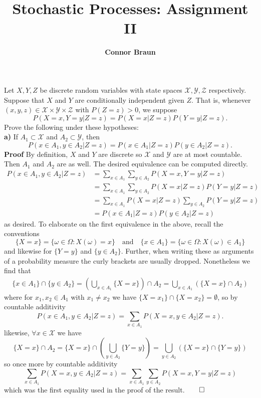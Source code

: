\documentclass[11pt, letterpaper]{article}
\title{\bf Stochastic Processes: Assignment II}
\author{\bf Connor Braun}
\date{}
\newcommand{\mc}[1]{\mathcal{#1}}
\begin{document}
    \maketitle
     Let $X,Y,Z$ be discrete random variables with state spaces $\mc{X},\mc{Y},\mc{Z}$ respectively. Suppose that $X$ and $Y$ are
    conditionally independent given $Z$. That is, whenever $(x,y,z)\in\mc{X}\times\mc{Y}\times\mc{Z}$ with $P(Z=z)>0$, we suppose
    \[P(X=x,Y=y|Z=z)=P(X=x|Z=z)P(Y=y|Z=z).\]
    Prove the following under these hypotheses:\\[10pt]
    {\bf a)} If $A_1\subset\mc{X}$ and $A_2\subset\mc{Y}$, then
    \[P(x\in A_1,y\in A_2|Z=z)=P(x\in A_1|Z=z)P(y\in A_2|Z=z).\]
    {\bf Proof} By definition, $X$ and $Y$ are discrete so $\mc{X}$ and $\mc{Y}$ are at most countable. Then $A_1$ and $A_2$ are as well. The desired equivalence can be computed directly.
    \begin{align*}
        P(x\in A_1,y\in A_2|Z=z)&=\sum_{x\in A_1}\sum_{y\in A_2}P(X=x,Y=y|Z=z)\tag{countable additivity}\\
        &=\sum_{x\in A_1}\sum_{y\in A_2}P(X=x|Z=z)P(Y=y|Z=z)\tag{conditional independence}\\
        &=\sum_{x\in A_1}P(X=x|Z=z)\sum_{y\in A_2}P(Y=y|Z=z)\\
        &=P(x\in A_1|Z=z)P(y\in A_2|Z=z)
    \end{align*} 
    as desired. To elaborate on the first equivalence in the above, recall the conventions
    \[\{X=x\}=\{\omega\in\Omega:X(\omega)=x\}\quad\text{and}\quad\{x\in A_1\}=\{\omega\in\Omega:X(\omega)\in A_1\}\]
    and likewise for $\{Y=y\}$ and $\{y\in A_2\}$. Further, when writing these as arguments of a probability measure the curly brackets are usually dropped. Nonetheless we find that
    \begin{align*}
        \{x\in A_1\}\cap \{y\in A_2\}=\left(\bigcup_{x\in A_1}\{X=x\}\right)\cap A_2=\bigcup_{x\in A_1}(\{X=x\}\cap A_2)
    \end{align*}
    where for $x_1,x_2\in A_1$ with $x_1\neq x_2$ we have $\{X=x_1\}\cap\{X=x_2\}=\emptyset$, so by countable additivity
    \[P(x\in A_1, y\in A_2|Z=z)=\sum_{x\in A_1}P(X=x,y\in A_2|Z=z).\]
    likewise, $\forall x\in \mc{X}$ we have
    \[\{X=x\}\cap A_2=\{X=x\}\cap\left(\bigcup_{y\in A_2}\{Y=y\}\right)=\bigcup_{y\in A_2}(\{X=x\}\cap\{Y=y\})\]
    so once more by countable additivity
    \[\sum_{x\in A_1}P(X=x,y\in A_2|Z=z)=\sum_{x\in A_1}\sum_{y\in A_2}P(X=x,Y=y|Z=z)\]
    which was the first equality used in the proof of the result.\hfill{$\qed$}\\[10pt]
\end{document}

